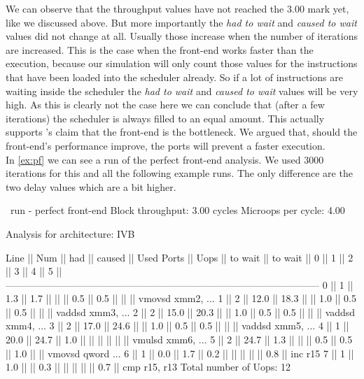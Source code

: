 We can observe that the throughput values have not reached the $3.00$ mark yet, like we discussed above. But more importantly the \emph{had to wait} and \emph{caused to wait} values did not change at all. Usually those increase when the number of iterations are increased. This is the case when the front-end works faster than the execution, because our simulation will only count those values for the instructions that have been loaded into the scheduler already. So if a lot of instructions are waiting inside the scheduler the \emph{had to wait} and \emph{caused to wait} values will be very high. As this is clearly not the case here we can conclude that (after a few iterations) the scheduler is always filled to an equal amount. This actually supports \iaca's claim that the front-end is the bottleneck. We argued that, should the front-end's performance improve, the ports will prevent a faster execution.\\
In \autoref{ex:pf} we can see a run of the perfect front-end analysis. We used $3000$ iterations for this and all the following example runs. The only difference are the two delay values which are a bit higher.


\begin{LabeledExample}{\suaca\ run - perfect front-end}{\label{ex:pf}}
    Block throughput: 3.00 cycles
    Microops per cycle: 4.00
    
    Analysis for architecture: IVB
    
     Line  ||   Num   ||   had   || caused  ||            Used Ports
           ||   Uops  || to wait || to wait ||   0   ||   1   ||   2   ||   3   ||   4   ||   5   ||
     ------------------------------------------------------------------------------------------------
       0   ||    1    ||   1.3   ||   1.7   ||       ||       ||  0.5  ||  0.5  ||       ||       || vmovsd xmm2, ...
       1   ||    2    ||  12.0   ||  18.3   ||       ||  1.0  ||  0.5  ||  0.5  ||       ||       || vaddsd xmm3, ...
       2   ||    2    ||  15.0   ||  20.3   ||       ||  1.0  ||  0.5  ||  0.5  ||       ||       || vaddsd xmm4, ...
       3   ||    2    ||  17.0   ||  24.6   ||       ||  1.0  ||  0.5  ||  0.5  ||       ||       || vaddsd xmm5, ...
       4   ||    1    ||  20.0   ||  24.7   ||  1.0  ||       ||       ||       ||       ||       || vmulsd xmm6, ...
       5   ||    2    ||  24.7   ||   1.3   ||       ||       ||  0.5  ||  0.5  ||  1.0  ||       || vmovsd qword ...
       6   ||    1    ||   0.0   ||   1.7   ||  0.2  ||       ||       ||       ||       ||  0.8  || inc r15
       7   ||    1    ||   1.0   ||         ||  0.3  ||       ||       ||       ||       ||  0.7  || cmp r15, r13
    Total number of Uops: 12
\end{LabeledExample}



